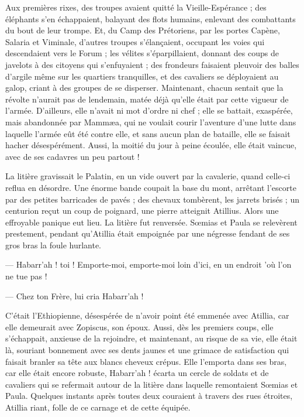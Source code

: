 \documentclass[a4paper, 11pt, oneside, polutonikogreek, french]{article}
\begin{document}
Aux premières rixes, des troupes avaient quitté la Vieille-Espérance ; des éléphants s'en échappaient, balayant des flots humains, enlevant des combattants du bout de leur trompe. Et, du Camp des Prétoriens, par les portes Capène, Salaria et Viminale, d'autres troupes s'élançaient, occupant les voies qui descendaient vers le Forum ; les vélites s'éparpillaient, donnant des coups de javelots à des citoyens qui s'enfuyaient ; des frondeurs faisaient pleuvoir des balles d'argile même sur les quartiers tranquilles, et des cavaliers se déployaient au galop, criant à des groupes de se disperser. Maintenant, chacun sentait que la révolte n'aurait pas de lendemain, matée déjà qu'elle était par cette vigueur de l'armée. D'ailleurs, elle n'avait ni mot d'ordre ni chef ; elle se battait, exaspérée, mais abandonnée par Mammæa, qui ne voulait courir l'aventure d’une lutte dans laquelle l'armée eût été contre elle, et sans aucun plan de bataille, elle se faisait hacher désespérément. Aussi, la moitié du jour à peine écoulée, elle était vaincue, avec de ses cadavres un peu partout !

La litière gravissait le Palatin, en un vide ouvert par la cavalerie, quand celle-ci reflua en désordre. Une énorme bande coupait la base du mont, arrêtant l'escorte par des petites barricades de pavés ; des chevaux tombèrent, les jarrets brisés ; un centurion reçut un coup de poignard, une pierre atteignit Atillius. Alors une effroyable panique eut lieu. La litière fut renversée. Sœmias et Paula se relevèrent prestement, pendant qu'Atillia était empoignée par une négresse fendant de ses gros bras la foule hurlante.

--- Habarr'ah ! toi ! Emporte-moi, emporte-moi loin d'ici, en un endroit 'où l'on ne tue pas !

--- Chez ton Frère, lui cria Habarr'ah !

C'était l'Ethiopienne, désespérée de n'avoir point été emmenée avec Atillia, car elle demeurait avec Zopiscus, son époux. Aussi, dès les premiers coups, elle s'échappait, anxieuse de la rejoindre, et maintenant, au risque de sa vie, elle était là, souriant bonnement avec ses dents jaunes et une grimace de satisfaction qui faisait branler sa tête aux blancs cheveux crépus. Elle l'emporta dans ses bras, car elle était encore robuste, Habarr'ah ! écarta un cercle de soldats et de cavaliers qui se refermait autour de la litière dans laquelle remontaient Sœmias et Paula. Quelques instants après toutes deux couraient à travers des rues étroites, Atillia riant, folle de ce carnage et de cette équipée.
\end{document}
